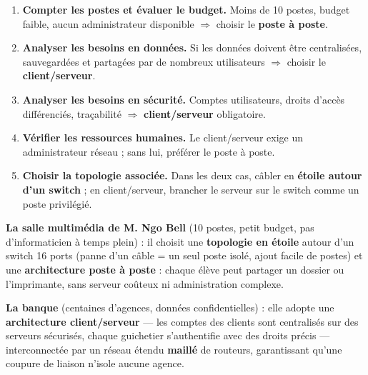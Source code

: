 \documentclass[11pt]{article}
\begin{document}
\begin{methode}
\begin{enumerate}
  \item \textbf{Compter les postes et évaluer le budget.} Moins de 10 postes, budget faible, aucun administrateur disponible $\Rightarrow$ choisir le \textbf{poste à poste}.
  \item \textbf{Analyser les besoins en données.} Si les données doivent être centralisées, sauvegardées et partagées par de nombreux utilisateurs $\Rightarrow$ choisir le \textbf{client/serveur}.
  \item \textbf{Analyser les besoins en sécurité.} Comptes utilisateurs, droits d'accès différenciés, traçabilité $\Rightarrow$ \textbf{client/serveur} obligatoire.
  \item \textbf{Vérifier les ressources humaines.} Le client/serveur exige un administrateur réseau ; sans lui, préférer le poste à poste.
  \item \textbf{Choisir la topologie associée.} Dans les deux cas, câbler en \textbf{étoile autour d'un switch} ; en client/serveur, brancher le serveur sur le switch comme un poste privilégié.
\end{enumerate}
\end{methode}

\begin{exemplebox}
\textbf{La salle multimédia de M. Ngo Bell} (10 postes, petit budget, pas d'informaticien à temps plein) : il choisit une \textbf{topologie en étoile} autour d'un switch 16 ports (panne d'un câble = un seul poste isolé, ajout facile de postes) et une \textbf{architecture poste à poste} : chaque élève peut partager un dossier ou l'imprimante, sans serveur coûteux ni administration complexe.

\textbf{La banque} (centaines d'agences, données confidentielles) : elle adopte une \textbf{architecture client/serveur} — les comptes des clients sont centralisés sur des serveurs sécurisés, chaque guichetier s'authentifie avec des droits précis — interconnectée par un réseau étendu \textbf{maillé} de routeurs, garantissant qu'une coupure de liaison n'isole aucune agence.
\end{exemplebox}
\end{document}
